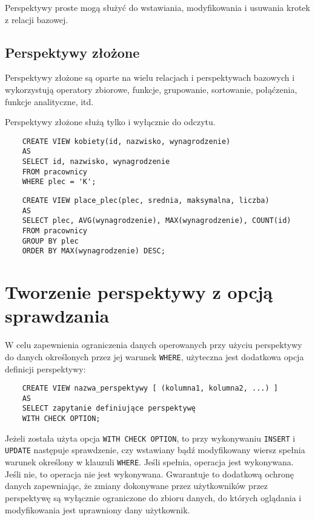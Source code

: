 \documentclass[a4paper]{article}
\begin{document}
Perspektywy proste mogą służyć do wstawiania, modyfikowania i usuwania krotek z relacji bazowej.

\subsection{Perspektywy złożone}

Perspektywy złożone są oparte na wielu relacjach i perspektywach bazowych i wykorzystują operatory zbiorowe, funkcje, grupowanie, sortowanie, połąćzenia, funkcje analityczne, itd.

Perspektywy złożone służą tylko i wyłącznie do odczytu.

\begin{verbatim}
    CREATE VIEW kobiety(id, nazwisko, wynagrodzenie)
    AS
    SELECT id, nazwisko, wynagrodzenie
    FROM pracownicy
    WHERE plec = 'K';
\end{verbatim}

\begin{verbatim}
    CREATE VIEW place_plec(plec, srednia, maksymalna, liczba)
    AS
    SELECT plec, AVG(wynagrodzenie), MAX(wynagrodzenie), COUNT(id)
    FROM pracownicy
    GROUP BY plec
    ORDER BY MAX(wynagrodzenie) DESC;
\end{verbatim}

\section{Tworzenie perspektywy z opcją sprawdzania}

W celu zapewnienia ograniczenia danych operowanych przy użyciu perspektywy do danych określonych przez jej warunek \texttt{WHERE}, użyteczna jest dodatkowa opcja definicji perspektywy:

\begin{verbatim}
    CREATE VIEW nazwa_perspektywy [ (kolumna1, kolumna2, ...) ]
    AS
    SELECT zapytanie definiujące perspektywę
    WITH CHECK OPTION;
\end{verbatim}

Jeżeli została użyta opcja \texttt{WITH CHECK OPTION}, to przy wykonywaniu \texttt{INSERT} i \texttt{UPDATE} następuje sprawdzenie, czy wstawiany bądź modyfikowany wiersz spełnia warunek określony w klauzuli \texttt{WHERE}. Jeśli spełnia, operacja jest wykonywana. Jeśli nie, to operacja nie jest wykonywana.
Gwarantuje to dodatkową ochronę danych zapewniając, że zmiany dokonywane przez użytkowników przez perspektywę są wyłącznie ograniczone do zbioru danych, do których oglądania i modyfikowania jest uprawniony dany użytkownik.
\end{document}
